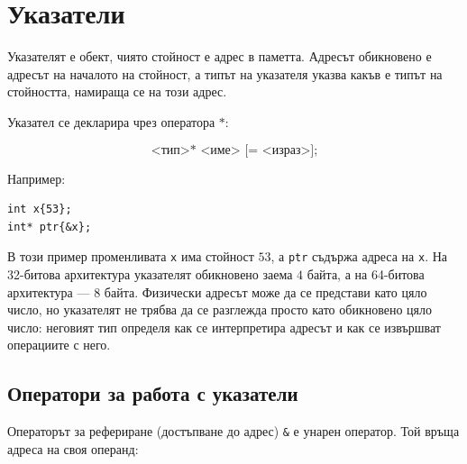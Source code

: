 \begin{konspekt}
\end{konspekt}

\section{Указатели}\label{s:15.1}

\begin{defn}
Указателят е обект, чиято стойност е адрес в паметта. Адресът обикновено е адресът на началото на стойност, а типът на указателя указва какъв е типът на стойността, намираща се на този адрес.
\end{defn}

Указател се декларира чрез оператора $*$:

\[
\texttt{<тип>* <име> [= <израз>];}
\]

Например:

\begin{verbatim}
int x{53};
int* ptr{&x};
\end{verbatim}

В този пример променливата \texttt{x} има стойност $53$, а \texttt{ptr} съдържа адреса на \texttt{x}. На 32-битова архитектура указателят обикновено заема $4$ байта, а на 64-битова архитектура --- $8$ байта. Физически адресът може да се представи като цяло число, но указателят не трябва да се разглежда просто като обикновено цяло число: неговият тип определя как се интерпретира адресът и как се извършват операциите с него.

\subsection{Оператори за работа с указатели}\label{s:15.1.1}

Операторът за рефериране (достъпване до адрес) \texttt{\&} е унарен оператор. Той връща адреса на своя операнд:

